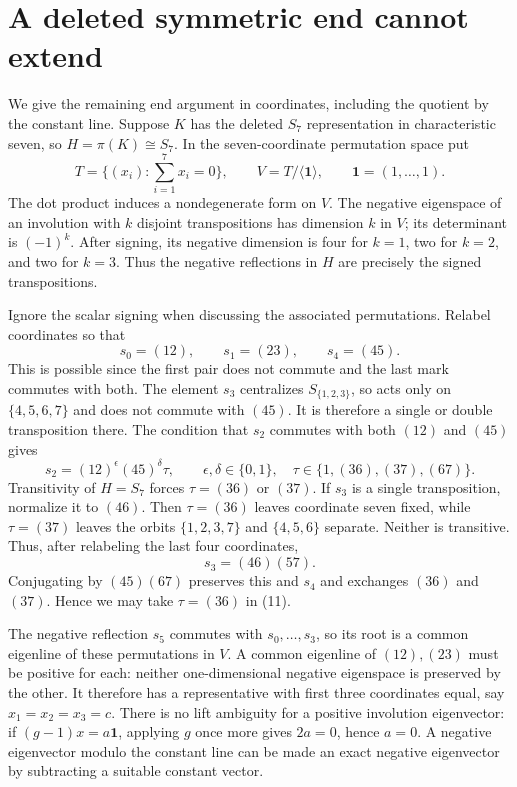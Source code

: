 \documentclass[11pt,a4paper]{article}
\newcommand{\gen}[1]{\langle#1\rangle}\newcommand{\Om}{\Omega}
\begin{document}
\section{A deleted symmetric end cannot extend}
We give the remaining end argument in coordinates, including the
quotient by the constant line. Suppose $K$ has the deleted $S_7$
representation in characteristic seven, so $H=\pi(K)\cong S_7$.
In the seven-coordinate permutation space put
\[
 T=\{(x_i):\textstyle\sum_{i=1}^7x_i=0\},\qquad
 V=T/\gen{\boldsymbol1},\qquad \boldsymbol1=(1,\ldots,1).
                                                               \tag{9}
\]
The dot product induces a nondegenerate form on $V$.
The negative eigenspace of an involution with $k$ disjoint
transpositions has dimension $k$ in $V$; its determinant is $(-1)^k$.
After signing, its negative dimension is four for $k=1$, two for
$k=2$, and two for $k=3$. Thus the negative reflections in $H$ are
precisely the signed transpositions.

Ignore the scalar signing when discussing the associated permutations.
Relabel coordinates so that
\[
       s_0=(12),\qquad s_1=(23),\qquad s_4=(45).          \tag{10}
\]
This is possible since the first pair does not commute and the last
mark commutes with both. The element $s_3$ centralizes $S_{\{1,2,3\}}$,
so acts only on $\{4,5,6,7\}$ and does not commute with $(45)$.
It is therefore a single or double transposition there. The condition
that $s_2$ commutes with both $(12)$ and $(45)$ gives
\[
 s_2=(12)^\epsilon(45)^\delta\tau,
 \qquad \epsilon,\delta\in\{0,1\},\quad
 \tau\in\{1,(36),(37),(67)\}.                         \tag{11}
\]
Transitivity of $H=S_7$ forces $\tau=(36)$ or $(37)$.
If $s_3$ is a single transposition, normalize it to $(46)$.
Then $\tau=(36)$ leaves coordinate seven fixed, while $\tau=(37)$
leaves the orbits $\{1,2,3,7\}$ and $\{4,5,6\}$ separate.
Neither is transitive. Thus, after relabeling the last four coordinates,
\[
                    s_3=(46)(57).
\]
Conjugating by $(45)(67)$ preserves this and $s_4$ and exchanges
$(36)$ and $(37)$. Hence we may take $\tau=(36)$ in (11).

The negative reflection $s_5$ commutes with $s_0,\ldots,s_3$,
so its root is a common eigenline of these permutations in $V$.
A common eigenline of $(12),(23)$ must be positive for each: neither
one-dimensional negative eigenspace is preserved by the other.
It therefore has a representative with first three coordinates equal,
say $x_1=x_2=x_3=c$. There is no lift ambiguity for a positive
involution eigenvector: if $(g-1)x=a\boldsymbol1$, applying $g$
once more gives $2a=0$, hence $a=0$. A negative eigenvector modulo
the constant line can be made an exact negative eigenvector by
subtracting a suitable constant vector.
\end{document}
